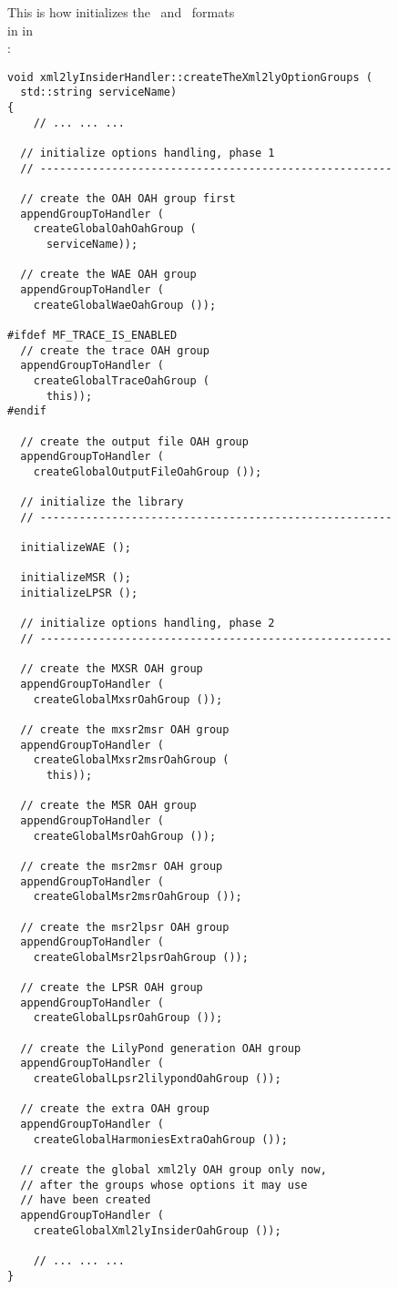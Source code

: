 This is how  initializes the \msrRepr\ and \lpsrRepr\ formats \\
in  in \\
:
\begin{lstlisting}[language=CPlusPlus]
void xml2lyInsiderHandler::createTheXml2lyOptionGroups (
  std::string serviceName)
{
	// ... ... ...

  // initialize options handling, phase 1
  // ------------------------------------------------------

  // create the OAH OAH group first
  appendGroupToHandler (
    createGlobalOahOahGroup (
      serviceName));

  // create the WAE OAH group
  appendGroupToHandler (
    createGlobalWaeOahGroup ());

#ifdef MF_TRACE_IS_ENABLED
  // create the trace OAH group
  appendGroupToHandler (
    createGlobalTraceOahGroup (
      this));
#endif

  // create the output file OAH group
  appendGroupToHandler (
    createGlobalOutputFileOahGroup ());

  // initialize the library
  // ------------------------------------------------------

  initializeWAE ();

  initializeMSR ();
  initializeLPSR ();

  // initialize options handling, phase 2
  // ------------------------------------------------------

  // create the MXSR OAH group
  appendGroupToHandler (
    createGlobalMxsrOahGroup ());

  // create the mxsr2msr OAH group
  appendGroupToHandler (
    createGlobalMxsr2msrOahGroup (
      this));

  // create the MSR OAH group
  appendGroupToHandler (
    createGlobalMsrOahGroup ());

  // create the msr2msr OAH group
  appendGroupToHandler (
    createGlobalMsr2msrOahGroup ());

  // create the msr2lpsr OAH group
  appendGroupToHandler (
    createGlobalMsr2lpsrOahGroup ());

  // create the LPSR OAH group
  appendGroupToHandler (
    createGlobalLpsrOahGroup ());

  // create the LilyPond generation OAH group
  appendGroupToHandler (
    createGlobalLpsr2lilypondOahGroup ());

  // create the extra OAH group
  appendGroupToHandler (
    createGlobalHarmoniesExtraOahGroup ());

  // create the global xml2ly OAH group only now,
  // after the groups whose options it may use
  // have been created
  appendGroupToHandler (
    createGlobalXml2lyInsiderOahGroup ());

	// ... ... ...
}
\end{lstlisting}

